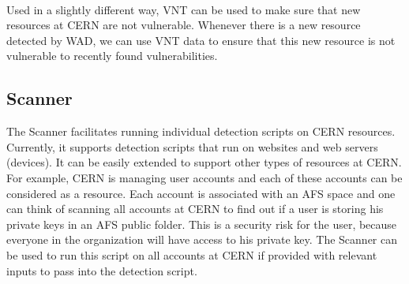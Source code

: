 \paragraph{}
Used in a slightly different way, VNT can be used to make sure that new resources at CERN are not vulnerable. Whenever there is a new resource detected by WAD, we can use VNT data to ensure that this new resource is not vulnerable to recently found vulnerabilities.
\subsection{Scanner}
The Scanner facilitates running individual detection scripts on CERN resources. Currently, it supports detection scripts that run on websites and web servers (devices). It can be easily extended to support other types of resources at CERN. For example, CERN is managing user accounts and each of these accounts can be considered as a resource. Each account is associated with an AFS space and one can think of scanning all accounts at CERN to find out if a user is storing his private keys in an AFS public folder. This is a security risk for the user, because everyone in the organization will have access to his private key. The Scanner can be used to run this script on all accounts at CERN if provided with relevant inputs to pass into the detection script.
\\